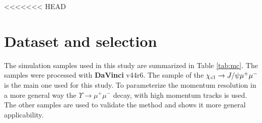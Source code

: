 <<<<<<< HEAD
\section{Dataset and selection}
\label{sec:dataset}
 The simulation samples used in this study are summarized in Table
 \ref{tab:mc}. The samples were processed with \textbf{DaVinci}
 v44r6. The sample of the ${\chi_{{c} 1}}
 \rightarrow J/\psi \mu^+ \mu^-$ is the main one used for this
 study. To parameterize  the momentum resolution in a more general way
 the $\Upsilon  \rightarrow \mu^+ \mu^-$ decay, with high momentum
 tracks is used. The other samples are used to validate the method and
 shows it more general applicability. 

\begin{table}[htb!]
\caption{\small Simulated data samples used in this study. }
\small
\begin{center}
\end{center}
\end{table}
